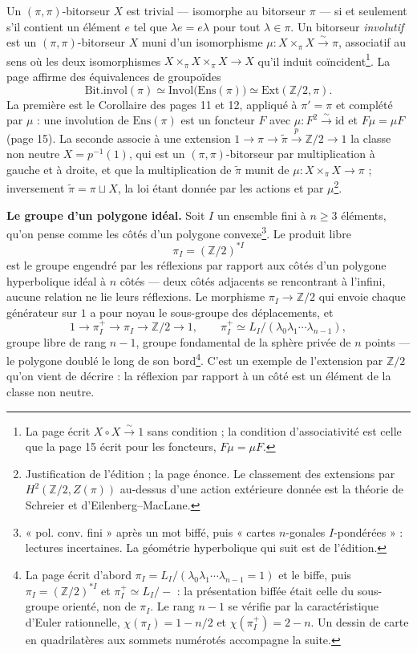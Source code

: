 \documentclass[11pt,a4paper]{article}
\begin{document}
Un $(\pi, \pi)$-bitorseur $X$ est trivial — isomorphe au bitorseur $\pi$ — si et
seulement s'il contient un élément $e$ tel que $\lambda e = e \lambda$ pour tout
$\lambda \in \pi$. Un bitorseur \emph{involutif} est un $(\pi, \pi)$-bitorseur $X$ muni
d'un isomorphisme $\mu : X \times_\pi X \xrightarrow{\sim} \pi$, associatif au sens où les
deux isomorphismes $X \times_\pi X \times_\pi X \to X$ qu'il induit coïncident\footnote{La
page écrit $X \circ X \xrightarrow{\sim} 1$ sans condition ; la condition
d'associativité est celle que la page 15 écrit pour les foncteurs,
$F\mu = \mu F$.}. La page affirme des équivalences de groupoïdes
\[
\mathrm{Bit.invol}(\pi) \simeq \mathrm{Invol}\bigl(\mathrm{Ens}(\pi)\bigr) \simeq \mathrm{Ext}(\mathbb{Z}/2, \pi).
\]
La première est le Corollaire des pages 11 et 12, appliqué à $\pi' = \pi$ et
complété par $\mu$ : une involution de $\mathrm{Ens}(\pi)$ est un foncteur $F$ avec
$\mu : F^2 \xrightarrow{\sim} \mathrm{id}$ et $F\mu = \mu F$ (page 15). La seconde
associe à une extension $1 \to \pi \to \widetilde{\pi} \xrightarrow{p} \mathbb{Z}/2 \to 1$ la
classe non neutre $X = p^{-1}(1)$, qui est un $(\pi, \pi)$-bitorseur par
multiplication à gauche et à droite, et que la multiplication de $\widetilde{\pi}$
munit de $\mu : X \times_\pi X \to \pi$ ; inversement $\widetilde{\pi} = \pi \sqcup X$, la
loi étant donnée par les actions et par $\mu$\footnote{Justification de
l'édition ; la page énonce. Le classement des extensions par
$H^2(\mathbb{Z}/2, Z(\pi))$ au-dessus d'une action extérieure donnée est la théorie de
Schreier et d'Eilenberg–MacLane.}.

\textbf{Le groupe d'un polygone idéal.} Soit $I$ un ensemble fini à $n \geq 3$
éléments, qu'on pense comme les côtés d'un polygone convexe\footnote{« pol.
conv. fini » après un mot biffé, puis « cartes $n$-gonales
$I$-pondérées » : lectures incertaines. La géométrie hyperbolique qui suit est
de l'édition.}. Le produit libre
\[
\pi_I = (\mathbb{Z}/2)^{*I}
\]
est le groupe engendré par les réflexions par rapport aux côtés d'un polygone
hyperbolique idéal à $n$ côtés — deux côtés adjacents se rencontrant à l'infini,
aucune relation ne lie leurs réflexions. Le morphisme $\pi_I \to \mathbb{Z}/2$ qui envoie
chaque générateur sur $1$ a pour noyau le sous-groupe des déplacements, et
\[
1 \to \pi_I^{+} \to \pi_I \to \mathbb{Z}/2 \to 1, \qquad
\pi_I^{+} \simeq L_I/(\lambda_0 \lambda_1 \cdots \lambda_{n-1}),
\]
groupe libre de rang $n - 1$, groupe fondamental de la sphère privée de $n$
points — le polygone doublé le long de son bord\footnote{La page écrit
d'abord $\pi_I = L_I/(\lambda_0\lambda_1\cdots\lambda_{n-1} = 1)$ et le biffe, puis
$\pi_I = (\mathbb{Z}/2)^{*I}$ et $\pi_I^{+} \simeq L_I/\!-$ : la présentation biffée était
celle du sous-groupe orienté, non de $\pi_I$. Le rang $n - 1$ se vérifie par la
caractéristique d'Euler rationnelle, $\chi(\pi_I) = 1 - n/2$ et
$\chi(\pi_I^{+}) = 2 - n$. Un dessin de carte en quadrilatères aux sommets
numérotés accompagne la suite.}. C'est un exemple de l'extension par
$\mathbb{Z}/2$ qu'on vient de décrire : la réflexion par rapport à un côté est un
élément de la classe non neutre.
\end{document}
